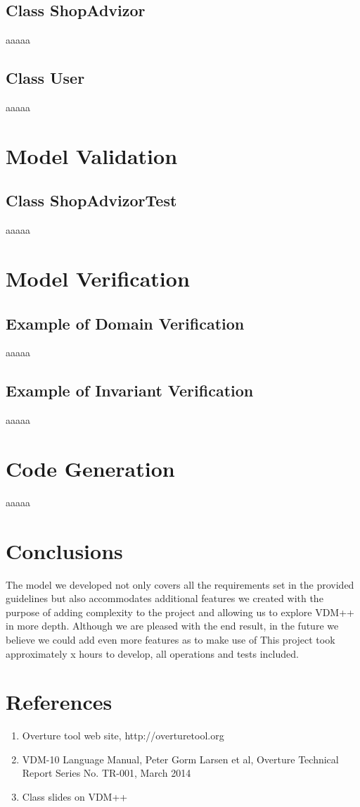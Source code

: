 \documentclass{article}
\begin{document}
\subsection{Class ShopAdvizor}
aaaaa
\subsection{Class User}
aaaaa

\section{Model Validation}
\subsection{Class ShopAdvizorTest}
aaaaa

\section{Model Verification}
\subsection{Example of Domain Verification}
aaaaa
\subsection{Example of Invariant Verification}
aaaaa

\section{Code Generation}
aaaaa

\section{Conclusions}
The model we developed not only covers all the requirements set in the provided guidelines but also accommodates additional features we created with the purpose of adding complexity to the project and allowing us to explore VDM++ in more depth.
Although we are pleased with the end result, in the future we believe we could add even more features as to make use of 
This project took approximately x hours to develop, all operations and tests included.

\section{References}
\begin{enumerate}  
\item Overture tool web site, http://overturetool.org
\item VDM-10 Language Manual, Peter Gorm Larsen et al, Overture Technical Report Series No. TR-001, March 2014
\item Class slides on VDM++ 
\end{enumerate}
\end{document}
